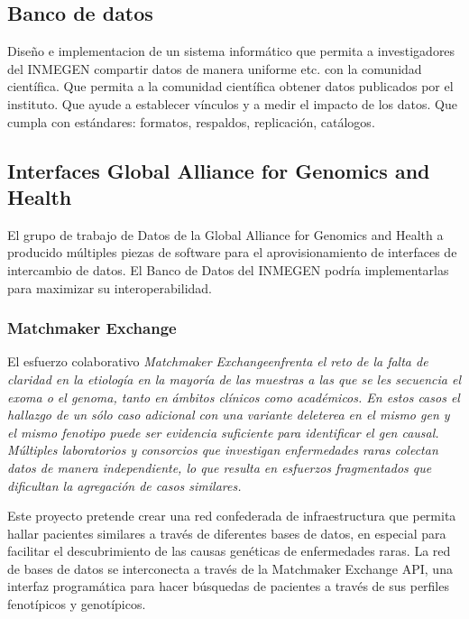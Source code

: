 \documentclass[
10pt, %
letterpaper, %
oneside, %
headinclude,footinclude, %
BCOR5mm, %
]{scrartcl}
\begin{document}
\subsection{Banco de datos}

Diseño e implementacion de un sistema informático que permita a
investigadores del INMEGEN compartir datos de manera uniforme etc. con
la comunidad científica. Que permita a la comunidad científica obtener
datos publicados por el instituto. Que ayude a establecer vínculos y a
medir el impacto de los datos. Que cumpla con estándares: formatos,
respaldos, replicación, catálogos.
\cite{_data_????}
\cite{altman_proposed_2007}



\subsection{Interfaces Global Alliance for Genomics and Health}

El grupo de trabajo de Datos de la Global Alliance for Genomics and
Health a producido múltiples piezas de software para el
aprovisionamiento de interfaces de intercambio de datos. El Banco de
Datos del INMEGEN podría implementarlas para maximizar su
interoperabilidad.

\subsubsection{Matchmaker Exchange}

El esfuerzo colaborativo \em{Matchmaker Exchange}\em  enfrenta el reto de la
falta de claridad en la etiología en la mayoría de las muestras a las
que se les secuencia el exoma o el genoma, tanto en ámbitos clínicos
como académicos. En estos casos el hallazgo de un sólo caso adicional
con una variante deleterea en el mismo gen y el mismo fenotipo puede
ser evidencia suficiente para identificar el gen causal. Múltiples
laboratorios y consorcios que investigan enfermedades raras colectan
datos de manera independiente, lo que resulta en esfuerzos
fragmentados que dificultan la agregación de casos similares.

Este proyecto pretende crear una red confederada de infraestructura
que permita hallar pacientes similares a través de diferentes bases de
datos, en especial para facilitar el descubrimiento de las causas
genéticas de enfermedades raras. La red de bases de datos se
interconecta a través de la Matchmaker Exchange API, una interfaz
programática para hacer búsquedas de pacientes a través de sus
perfiles fenotípicos y genotípicos.\cite{_matchmaker_????}
\end{document}
